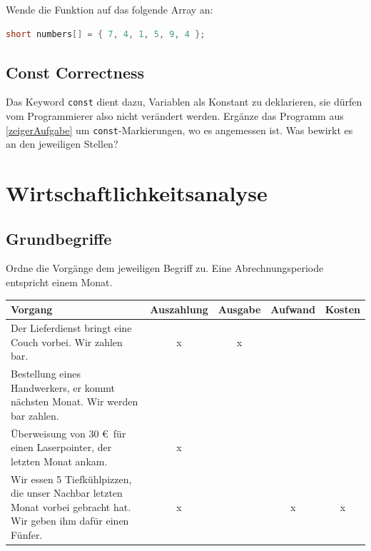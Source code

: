 \documentclass[11pt, a4paper]{article}
\begin{document}
Wende die Funktion auf das folgende Array an:
\begin{lstlisting}[language=C]
	short numbers[] = { 7, 4, 1, 5, 9, 4 };
\end{lstlisting}


\subsection{Const Correctness}
Das Keyword \texttt{const} dient dazu, Variablen als Konstant zu deklarieren, sie dürfen vom Programmierer also nicht verändert werden. Ergänze das Programm aus \ref{zeigerAufgabe} um \texttt{const}-Markierungen, wo es angemessen ist. Was bewirkt es an den jeweiligen Stellen?


\newpage
\section{Wirtschaftlichkeitsanalyse}
\subsection{Grundbegriffe}
Ordne die Vorgänge dem jeweiligen Begriff zu. Eine Abrechnungsperiode entspricht einem Monat.

\begin{tabularx}{\columnwidth}{X|c|c|c|c}
	Vorgang & Auszahlung & Ausgabe & Aufwand & Kosten \\ \hline
	Der Lieferdienst bringt eine Couch vorbei. Wir zahlen bar. & x & x &  &  \\ \hline
	Bestellung eines Handwerkers, er kommt nächsten Monat. Wir werden bar zahlen. &  &  &  &  \\ \hline
	Überweisung von 30 \euro \ für einen Laserpointer, der letzten Monat ankam. & x &  &  & \\ \hline
	Wir essen 5 Tiefkühlpizzen, die unser Nachbar letzten Monat vorbei gebracht hat. Wir geben ihm dafür einen Fünfer. & x &  & x & x
\end{tabularx}
\end{document}
